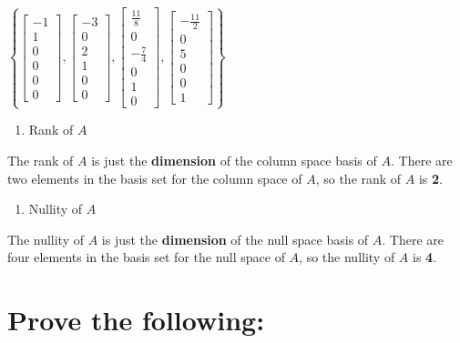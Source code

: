 \documentclass[
  letterpaper,
  DIV=11,
  numbers=noendperiod]{scrartcl}
\providecommand{\tightlist}{%
  \setlength{\itemsep}{0pt}\setlength{\parskip}{0pt}}\usepackage{longtable,booktabs,array}
\begin{document}
\(\left\{\begin{bmatrix}-1 \\ 1 \\ 0 \\ 0 \\ 0 \\ 0\end{bmatrix}, \begin{bmatrix}-3 \\ 0 \\ 2 \\ 1 \\ 0 \\ 0\end{bmatrix}, \begin{bmatrix}\frac{11}{8}\\ 0 \\ -\frac{7}{4} \\ 0 \\ 1 \\ 0\end{bmatrix}, \begin{bmatrix}-\frac{11}{2} \\ 0 \\ 5 \\ 0 \\ 0 \\ 1\end{bmatrix}\right\}\)

\begin{enumerate}
\def\labelenumi{\alph{enumi}.}
\setcounter{enumi}{3}
\tightlist
\item
  Rank of \(A\)
\end{enumerate}

The rank of \(A\) is just the \textbf{dimension} of the column space
basis of \(A\). There are two elements in the basis set for the column
space of \(A\), so the rank of \(A\) is \textbf{2}.

\begin{enumerate}
\def\labelenumi{\alph{enumi}.}
\setcounter{enumi}{4}
\tightlist
\item
  Nullity of \(A\)
\end{enumerate}

The nullity of \(A\) is just the \textbf{dimension} of the null space
basis of \(A\). There are four elements in the basis set for the null
space of \(A\), so the nullity of \(A\) is \textbf{4}.

\newpage{}

\hypertarget{prove-the-following}{%
\section{Prove the following:}\label{prove-the-following}}
\end{document}
